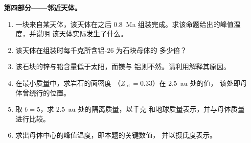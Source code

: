 \begin{problem}
\noindent\textbf{第四部分——邻近天体。}
\begin{enumerate}[resume]
  \item 一块来自某天体，该天体在之后
        \qty{0.8}{Ma} 组装完成。求该命题给出的峰值温度，并说明
        该天体实际发生了什么。
  \item 该天体在组装时每千克所含铝-26 为石块母体的
        多少倍？
  \item 该石块的锌与铅含量低于太阳，而镁与
        铝则不然。请利用解释其原因。
  \item 在最小质量中，求岩石的面密度
        （$Z_{\mathrm{rel}} = 0.33$）在 \qty{2.5}{au} 处的值，
        该处即母体曾绕行的位置。
  \item 取 $b = 5$，求 \qty{2.5}{au} 处的隔离质量，以千克
        和地球质量表示，并与母体质量进行比较。
  \item 求出母体中心的峰值温度，即本题的关键数值，
        并以摄氏度表示。
\end{enumerate}
\end{problem}
